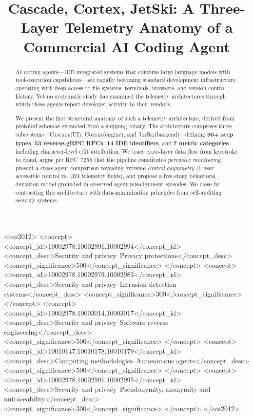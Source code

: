 \documentclass[sigconf,anonymous]{acmart}
\newcommand{\cascade}{\textsc{Cascade}\xspace}
\newcommand{\cortex}{\textsc{Cortex}\xspace}
\newcommand{\jetski}{\textsc{JetSki}\xspace}
\begin{document}
\title{Cascade, Cortex, JetSki: A Three-Layer Telemetry Anatomy of a Commercial AI Coding Agent}

\begin{abstract}
AI coding agents---IDE-integrated systems that combine large language
models with tool-execution capabilities---are rapidly becoming standard
development infrastructure, operating with deep access to file systems,
terminals, browsers, and version-control history.  Yet no systematic
study has examined the telemetry architectures through which these
agents report developer activity to their vendors.

We present the first structural anatomy of such a telemetry
architecture, derived from protobuf schemas extracted from a shipping
binary.  The architecture comprises three subsystems---\cascade (UI),
\cortex (engine), and \jetski (backend)---defining \textbf{90+ step
types}, \textbf{53 reverse-gRPC RPCs}, \textbf{14 IDE identifiers},
and \textbf{7 metric categories} including character-level edit
attribution.  We trace cross-layer data flow from keystroke to cloud,
argue per RFC~7258 that the pipeline constitutes \emph{pervasive
monitoring}, present a cross-agent comparison revealing extreme
\emph{control asymmetry} (1 user-accessible control vs.\ 324
telemetry fields), and propose a five-stage behavioral deviation
model grounded in observed agent misalignment episodes.  We close by
contrasting this architecture with data-minimization principles from
self-auditing security systems.
\end{abstract}

\begin{CCSXML}
<ccs2012>
   <concept>
       <concept_id>10002978.10002991.10002994</concept_id>
       <concept_desc>Security and privacy~Privacy protections</concept_desc>
       <concept_significance>500</concept_significance>
   </concept>
   <concept>
       <concept_id>10002978.10002979.10002983</concept_id>
       <concept_desc>Security and privacy~Intrusion detection systems</concept_desc>
       <concept_significance>300</concept_significance>
   </concept>
   <concept>
       <concept_id>10002978.10003014.10003017</concept_id>
       <concept_desc>Security and privacy~Software reverse engineering</concept_desc>
       <concept_significance>500</concept_significance>
   </concept>
   <concept>
       <concept_id>10010147.10010178.10010179</concept_id>
       <concept_desc>Computing methodologies~Autonomous agents</concept_desc>
       <concept_significance>500</concept_significance>
   </concept>
   <concept>
       <concept_id>10002978.10002991.10002995</concept_id>
       <concept_desc>Security and privacy~Pseudonymity, anonymity and untraceability</concept_desc>
       <concept_significance>300</concept_significance>
   </concept>
</ccs2012>
\end{CCSXML}
\end{document}
